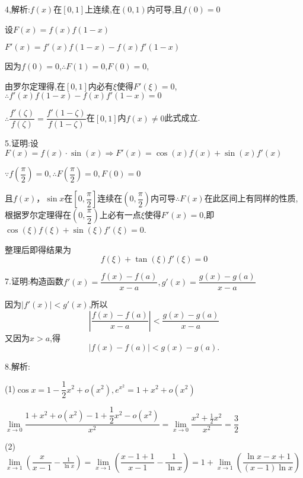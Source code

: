 4,解析:$f(x)$在$[0,1]$上连续,在$(0,1)$内可导,且$f\left( 0 \right) = 0 $

设$F\left( x \right) = f\left( x \right)f\left( {1 - x} \right)$

$F'\left( x \right) = f'\left( x \right)f\left( {1 - x} \right) - f\left( x \right)f'\left( {1 - x} \right)$

因为$f\left( 0 \right) = 0 $,$\therefore F\left( 1 \right) = 0 $,$F\left( 0 \right) = 0 $,

由罗尔定理得,在$[0,1]$内必有$\xi $使得$F'\left( \xi  \right) = 0$,$\therefore f'\left( x \right)f\left( {1 - x} \right) - f\left( x \right)f'\left( {1 - x} \right) = 0$

$\therefore \dfrac{{f'\left( \zeta  \right)}}{{f\left( \zeta  \right)}} = \dfrac{{f'\left( {1 - \zeta } \right)}}{{f\left( {1 - \zeta } \right)}}$在$[0,1]$内$f(x) \ne 0$此式成立.

5.证明:设$F\left( x \right) = f\left( x \right) \cdot \sin \left( x \right) \Rightarrow F'\left( x \right) = \cos (x)f(x) + \sin (x)f'(x)$

$\because f\left( {\dfrac{\pi }{2}} \right) = 0,\therefore F\left( {\dfrac{\pi }{2}} \right) = 0,F\left( 0 \right) = 0$

且$f(x)$，$\sin x$在$[0,\dfrac {\pi}{2}]$连续在$(0,\dfrac {\pi}{2})$内可导$\therefore F\left( x \right)$在此区间上有同样的性质,根据罗尔定理得在$(0,\dfrac {\pi}{2})$上必有一点$\xi$使得$F'\left( x \right) = 0$,即$\cos (\xi )f(\xi ) + \sin (\xi )f'(\xi ) = 0$.

整理后即得结果为\[f\left( \xi  \right) + \tan \left( \xi  \right)f'\left( \xi  \right) = 0\]

7.证明:构造函数$f'\left( x \right) = \dfrac{{f(x) - f(a)}}{{x - a}},g'\left( x \right) = \dfrac{{g(x) - g(a)}}{{x - a}}$

因为$\left| {f'\left( x \right)} \right| < g'\left( x \right)$,所以
\[\left| {\dfrac{{f(x) - f(a)}}{{x - a}}} \right| < \dfrac{{g(x) - g(a)}}{{x - a}}\]
又因为$x > a$,得\[\left| {f\left( x \right) - f(a)} \right| < g\left( x \right) - g(a).\]

8.解析:

(1)$\cos x = 1 - \dfrac{1}{2}{x^2} + o({x^2}),{e^{x^2}} = 1 + {x^2} + o({x^2})$

$\lim\limits_{x \to 0}  \dfrac{{1 + {x^2} + o({x^2}) - 1 + \dfrac{1}{2}{x^2} - o({x^2})}}{{{x^2}}} = \lim\limits_{x \to 0}  \dfrac{{{x^2} + \frac{1}{2}{x^2}}}{{{x^2}}} = \dfrac{3}{2}$

(2)$\lim\limits_{x \to 1}  \left( {\dfrac{x}{{x - 1}} - \frac{1}{{\ln x}}} \right) = \lim\limits_{x \to 1}  \left( {\dfrac{{x - 1 + 1}}{{x - 1}} - \dfrac{1}{{\ln x}}} \right) = 1 + \lim\limits_{x \to 1}  \left( {\dfrac{{\ln x - x + 1}}{{\left( {x - 1} \right)\ln x}}} \right)$

